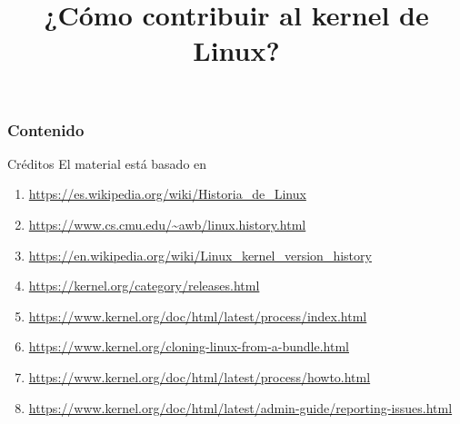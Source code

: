 \documentclass[aspectratio=169]{beamer}
\title{¿Cómo contribuir al kernel de Linux?}
\begin{document}
\begin{frame}
    \titlepage
\end{frame}

\begin{frame}
    \frametitle{Contenido}
    \tableofcontents
\end{frame}



\begin{frame}[c]{Créditos}
  \label{creditos}
  El material está basado en
  \begin{enumerate}
    \item
      \href{https://es.wikipedia.org/wiki/Historia_de_Linux}
      {https://es.wikipedia.org/wiki/Historia\_de\_Linux}
    \item
      \href{https://www.cs.cmu.edu/~awb/linux.history.html}
      {https://www.cs.cmu.edu/\~{}awb/linux.history.html}
    \item
      \href{https://en.wikipedia.org/wiki/Linux_kernel_version_history}
      {https://en.wikipedia.org/wiki/Linux\_kernel\_version\_history}
    \item
      \href{https://kernel.org/category/releases.html}
      {https://kernel.org/category/releases.html}
    \item
      \href{https://www.kernel.org/doc/html/latest/process/index.html}
      {https://www.kernel.org/doc/html/latest/process/index.html}
    \item
      \href{https://www.kernel.org/cloning-linux-from-a-bundle.html}
      {https://www.kernel.org/cloning-linux-from-a-bundle.html}
    \item
      \href{https://www.kernel.org/doc/html/latest/process/howto.html}
      {https://www.kernel.org/doc/html/latest/process/howto.html}
    \item
      \href{https://www.kernel.org/doc/html/latest/admin-guide/reporting-issues.html}
      {https://www.kernel.org/doc/html/latest/admin-guide/reporting-issues.html}
  \end{enumerate}
\end{frame}
\end{document}
